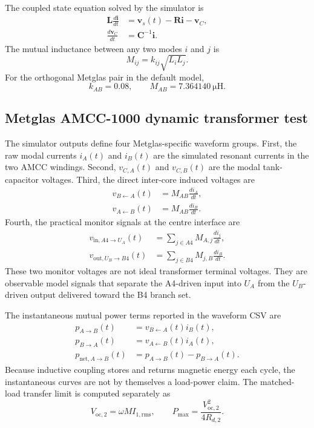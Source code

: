 The coupled state equation solved by the simulator is
\begin{align}
\mathbf{L}\frac{d\mathbf{i}}{dt} &= \mathbf{v}_s(t)-\mathbf{R}\mathbf{i}-\mathbf{v}_C,\\
\frac{d\mathbf{v}_C}{dt} &= \mathbf{C}^{-1}\mathbf{i}.
\end{align}
The mutual inductance between any two modes \(i\) and \(j\) is
\begin{equation}
M_{ij}=k_{ij}\sqrt{L_iL_j}.
\end{equation}
For the orthogonal Metglas pair in the default model,
\begin{equation}
k_{AB}=0.08, \qquad M_{AB}=\SI{7.364140}{\micro\henry}.
\end{equation}

\subsection{Metglas AMCC-1000 dynamic transformer test}

The simulator outputs define four Metglas-specific waveform groups. First, the
raw modal currents \(i_A(t)\) and \(i_B(t)\) are the simulated resonant
currents in the two AMCC windings. Second, \(v_{C,A}(t)\) and \(v_{C,B}(t)\)
are the modal tank-capacitor voltages. Third, the direct inter-core induced
voltages are
\begin{align}
v_{B\leftarrow A}(t) &= M_{AB}\frac{di_A}{dt},\\
v_{A\leftarrow B}(t) &= M_{AB}\frac{di_B}{dt}.
\end{align}
Fourth, the practical monitor signals at the centre interface are
\begin{align}
v_{\mathrm{in},A4\rightarrow U_A}(t)
&= \sum_{j\in A4} M_{A,j}\frac{di_j}{dt},\\
v_{\mathrm{out},U_B\rightarrow B4}(t)
&= \sum_{j\in B4} M_{j,B}\frac{di_B}{dt}.
\end{align}
These two monitor voltages are not ideal transformer terminal voltages. They
are observable model signals that separate the A4-driven input into \(U_A\)
from the \(U_B\)-driven output delivered toward the B4 branch set.

The instantaneous mutual power terms reported in the waveform CSV are
\begin{align}
p_{A\rightarrow B}(t)&=v_{B\leftarrow A}(t)i_B(t),\\
p_{B\rightarrow A}(t)&=v_{A\leftarrow B}(t)i_A(t),\\
p_{\mathrm{net},A\rightarrow B}(t)&=p_{A\rightarrow B}(t)-p_{B\rightarrow A}(t).
\end{align}
Because inductive coupling stores and returns magnetic energy each cycle, the
instantaneous curves are not by themselves a load-power claim. The matched-load
transfer limit is computed separately as
\begin{equation}
V_{\mathrm{oc},2}=\omega M I_{1,\mathrm{rms}},
\qquad
P_{\max}=\frac{V_{\mathrm{oc},2}^{2}}{4R_{d,2}}.
\end{equation}

